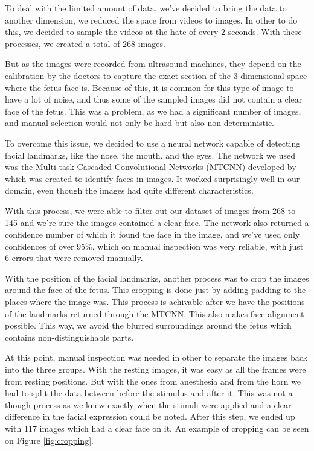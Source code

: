 To deal with the limited amount of data, we've decided to bring the data to another dimension, we reduced the space from videos to images. In other to do this, we decided to sample the videos at the hate of every 2 seconds. With these processes, we created a total of 268 images.

But as the images were recorded from ultrasound machines, they depend on the calibration by the doctors to capture the exact section of the 3-dimensional space where the fetus face is. Because of this, it is common for this type of image to have a lot of noise, and thus some of the sampled images did not contain a clear face of the fetus. This was a problem, as we had a significant number of images, and manual selection would not only be hard but also non-deterministic.

To overcome this issue, we decided to use a neural network capable of detecting facial landmarks, like the nose, the mouth, and the eyes. The network we used was the Multi-task Cascaded Convolutional Networks (MTCNN) developed by \cite{ZhangZL016} which was created to identify faces in images. It worked surprisingly well in our domain, even though the images had quite different characteristics.

With this process, we were able to filter out our dataset of images from 268 to 145 and we're sure the images contained a clear face. The network also returned a confidence number of which it found the face in the image, and we've used only confidences of over 95\%, which on manual inspection was very reliable, with just 6 errors that were removed manually.

With the position of the facial landmarks, another process was to crop the images around the face of the fetus. This cropping is done just by adding padding to the places where the image was. This process is achivable after we have the positions of the landmarks returned through the MTCNN. This also makes face alignment possible. This way, we avoid the blurred surroundings around the fetus which contains non-distinguishable parts. 

At this point, manual inspection was needed in other to separate the images back into the three groups. With the resting images, it was easy as all the frames were from resting positions. But with the ones from anesthesia and from the horn we had to split the data between before the stimulus and after it. This was not a though process as we knew exactly when the stimuli were applied and a clear difference in the facial expression could be noted. After this step, we ended up with 117 images which had a clear face on it. An example of cropping can be seen on Figure \ref{fig:cropping}.

